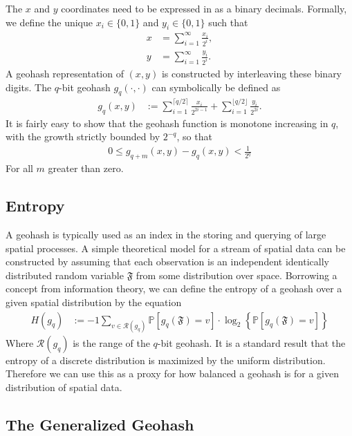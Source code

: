 \documentclass{article} %
\begin{document}
The $x$ and $y$ coordinates need to be expressed in as a binary decimals.
Formally, we define the unique $x_i \in \{0,1 \}$ and $y_i \in \{0,1\}$
such that
\begin{align}
x &= \sum_{i=1}^{\infty} \frac{x_i}{2^i},\\
y &= \sum_{i=1}^{\infty} \frac{y_i}{2^i}.
\end{align}
A geohash representation of $(x,y)$ is constructed by interleaving these
binary digits. The $q$-bit geohash $g_q(\cdot,\cdot)$ can symbolically
be defined as
\begin{align}
g_q(x,y) &:=  \sum_{i=1}^{\lceil q/2 \rceil} \frac{x_i}{2^{2i-1}} +
              \sum_{i=1}^{\lfloor q/2 \rfloor} \frac{y_i}{2^{2i}}.
\end{align}
It is fairly easy to show that the geohash function is monotone increasing
in $q$, with the growth strictly bounded by $2^{-q}$, so that
\begin{align}
0 \leq g_{q+m}(x,y) - g_{q}(x,y) < \frac{1}{2^q}
\end{align}
For all $m$ greater than zero.

\subsection{Entropy}

A geohash is typically used as an index in the storing and querying of large
spatial processes. A simple theoretical model for a stream of spatial data can
be constructed by assuming that each observation is an independent identically
distributed random variable $\mathfrak{F}$ from some distribution over space.
Borrowing a concept from information theory, we can define the entropy of a geohash
over a given spatial distribution by the equation
\begin{align}
H(g_q) &:= -1 \sum_{v \in \mathcal{R}(g_q)} \mathbb{P} \left[ g_q(\mathfrak{F}) = v\right] \cdot
            \log_2 \left\{ \mathbb{P} \left[ g_q(\mathfrak{F}) = v\right] \right\} \label{entropyDef}
\end{align}
Where $\mathcal{R}(g_q)$ is the range of the $q$-bit geohash. It is a standard result
that the entropy of a discrete distribution is maximized by the uniform distribution.
Therefore we can use this as a proxy for how balanced a geohash is for a given distribution
of spatial data.

\subsection{The Generalized Geohash}
\end{document}
